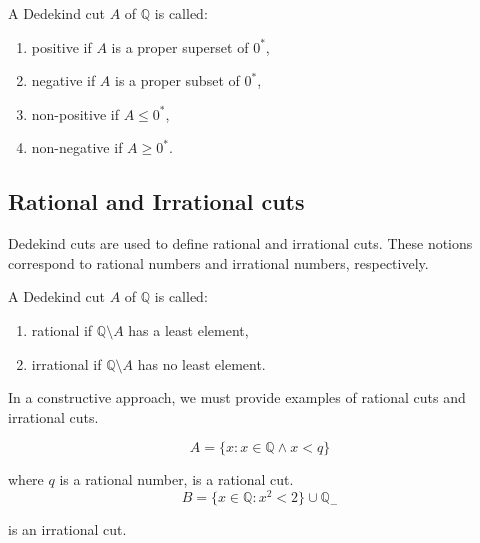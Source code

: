 \begin{definition}
    A Dedekind cut $A$ of $\mathbb{Q}$ is called:
    \begin{enumerate}[label={(\roman*)},itemsep=0pt]
        \item positive if $A$ is a proper superset of ${0}^{*}$,
        \item negative if $A$ is a proper subset of ${0}^{*}$,
        \item non-positive if $A\le {0}^{*}$,
        \item non-negative if $A\ge {0}^{*}$.
    \end{enumerate}
\end{definition}

\subsection{Rational and Irrational cuts}

Dedekind cuts are used to define rational and irrational cuts. These notions correspond to rational numbers and irrational numbers, respectively.

\begin{definition}
    A Dedekind cut $A$ of $\mathbb{Q}$ is called:
    \begin{enumerate}[label={(\roman*)},itemsep=0pt]
        \item rational if $\mathbb{Q}\setminus A$ has a least element,
        \item irrational if $\mathbb{Q}\setminus A$ has no least element.
    \end{enumerate}
\end{definition}

In a constructive approach, we must provide examples of rational cuts and irrational cuts.

\begin{example}
    \[
        A = \{ x : x\in\mathbb{Q}\land x < q \}
    \]

    where $q$ is a rational number, is a rational cut.
    \[
        B = \{ x\in\mathbb{Q}: {x}^{2} < 2 \} \cup \mathbb{Q}_{-}
    \]

    is an irrational cut.
\end{example}

